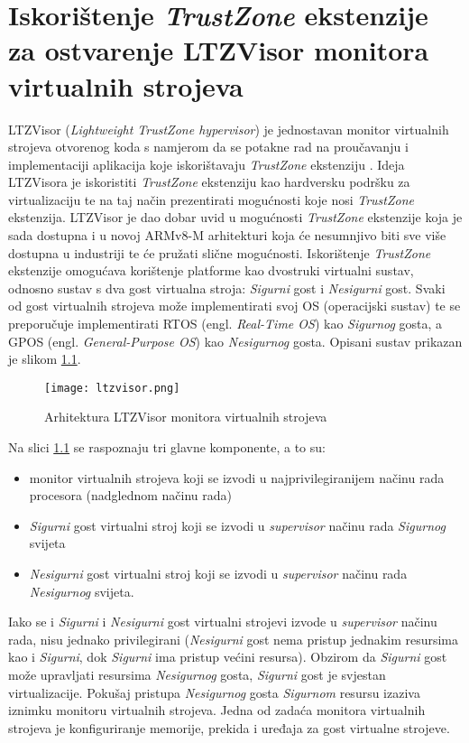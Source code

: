 \documentclass[times, utf8, diplomski, numeric]{fer}
\begin{document}
\chapter{Iskorištenje \textit{TrustZone} ekstenzije za ostvarenje LTZVisor monitora virtualnih strojeva}
LTZVisor (\textit{Lightweight TrustZone hypervisor}) je jednostavan monitor virtualnih strojeva otvorenog koda s namjerom
da se potakne rad na proučavanju i implementaciji aplikacija koje iskorištavaju \textit{TrustZone} ekstenziju \cite{ltzvisor}.
Ideja LTZVisora je iskoristiti \textit{TrustZone} ekstenziju kao hardversku podršku za virtualizaciju te na taj način
prezentirati mogućnosti koje nosi \textit{TrustZone} ekstenzija. LTZVisor je dao dobar uvid u mogućnosti \textit{TrustZone}
ekstenzije koja je sada dostupna i u novoj ARMv8-M arhitekturi koja će nesumnjivo biti sve više dostupna u industriji te
će pružati slične mogućnosti. Iskorištenje \textit{TrustZone} ekstenzije omogućava korištenje platforme kao dvostruki virtualni
sustav, odnosno sustav s dva gost virtualna stroja: \textit{Sigurni} gost i \textit{Nesigurni} gost. Svaki od gost virtualnih strojeva može
implementirati svoj OS (operacijski sustav) te se preporučuje implementirati RTOS (engl. \textit{Real-Time OS}) kao
\textit{Sigurnog} gosta, a GPOS (engl. \textit{General-Purpose OS}) kao \textit{Nesigurnog} gosta.
Opisani sustav prikazan je slikom \ref{ltzvisor}.
\begin{figure}[H]
  \centering
	\texttt{[image: ltzvisor.png]}%
	\caption{Arhitektura LTZVisor monitora virtualnih strojeva \cite{ltzvisor}}
	\label{ltzvisor}%
\end{figure}
Na slici \ref{ltzvisor} se raspoznaju tri glavne komponente, a to su:
\begin{itemize}
  \item{monitor virtualnih strojeva koji se izvodi u najprivilegiranijem načinu rada procesora (nadglednom načinu rada)}
  \item{\textit{Sigurni} gost virtualni stroj koji se izvodi u \textit{supervisor} načinu rada \textit{Sigurnog} svijeta}
  \item{\textit{Nesigurni} gost virtualni stroj koji se izvodi u \textit{supervisor} načinu rada \textit{Nesigurnog} svijeta.}
\end{itemize}
Iako se i \textit{Sigurni} i \textit{Nesigurni} gost virtualni strojevi izvode u \textit{supervisor} načinu rada, nisu jednako privilegirani
(\textit{Nesigurni} gost nema pristup jednakim resursima kao i \textit{Sigurni}, dok \textit{Sigurni} ima pristup većini resursa). Obzirom da
\textit{Sigurni} gost može upravljati resursima \textit{Nesigurnog} gosta, \textit{Sigurni} gost je svjestan virtualizacije. Pokušaj pristupa \textit{Nesigurnog}
gosta \textit{Sigurnom} resursu izaziva iznimku monitoru virtualnih strojeva.
Jedna od zadaća monitora virtualnih strojeva je konfiguriranje memorije, prekida i uređaja za gost virtualne strojeve.
\end{document}
